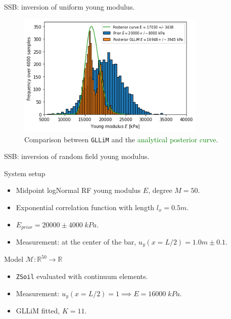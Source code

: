 	\begin{frame}{SSB: inversion of uniform young modulus.}
	\begin{figure}
	\includegraphics[width=0.8\textwidth]{graphs/E_single/bayes_inversion_disc=0.1_gllim.png}
	\caption{Comparison between \texttt{GLLiM} and the \textcolor{green}{analytical posterior curve}.}
	\end{figure}
	\end{frame}
	
	\begin{frame}{SSB: inversion of random field young modulus.}
	\begin{block}{System setup}
	\begin{itemize}
	\item Midpoint logNormal RF young modulus $E$, degree $M = 50$.
	\item Exponential correlation function with length $l_x = 0.5 \si{m}$.
	\item $E_{prior} = 20000 \pm 4000 \; \si{kPa}$.
	\item Measurement: at the center of the bar, $u_y(x=L/2) = 1.0 \si{m} \pm 0.1$.
	\end{itemize}
	\end{block}
	\begin{block}{Model $\mathcal{M} : \mathbb{R}^{50} \rightarrow \mathbb{R}$}
	\begin{itemize}
	\item \texttt{ZSoil} evaluated with continuum elements.
	\item Measurement: $u_y(x=L/2) = 1 \implies E = 16000 \; \si{kPa}$.
	\item GLLiM fitted, $K = 11$.
	\end{itemize}
	\end{block}
	\end{frame}
	
